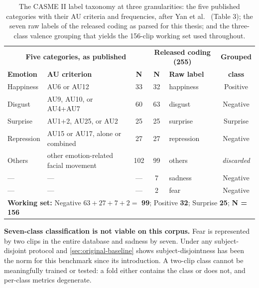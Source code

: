 \begin{table}[htbp]
	\centering
	\footnotesize
	\begin{tabular}{l l c c l c}
		\hline
		\multicolumn{3}{c}{\textbf{Five categories, as published}} & \multicolumn{2}{c}{\textbf{Released coding (255)}} & \textbf{Grouped} \\
		\textbf{Emotion} & \textbf{AU criterion} & \textbf{N} & \textbf{N} & \textbf{Raw label} & \textbf{class} \\
		\hline
		Happiness  & AU6 or AU12                           & 33  & 32 & happiness  & Positive \\
		Disgust    & AU9, AU10, or AU4+AU7                 & 60  & 63 & disgust    & Negative \\
		Surprise   & AU1+2, AU25, or AU2                   & 25  & 25 & surprise   & Surprise \\
		Repression & AU15 or AU17, alone or combined       & 27  & 27 & repression & Negative \\
		Others     & other emotion-related facial movement & 102 & 99 & others     & \textit{discarded} \\
		---        & ---                                   & --- & 7  & sadness    & Negative \\
		---        & ---                                   & --- & 2  & fear       & Negative \\
		\hline
		\multicolumn{6}{l}{\textbf{Working set:} Negative $63+27+7+2 = $ \textbf{99}; Positive \textbf{32}; Surprise \textbf{25}; \textbf{N = 156}} \\
		\hline
	\end{tabular}
	\caption[CASME II label taxonomy and the three-class working set]{The CASME II label taxonomy at three granularities: the five published categories with their AU criteria and frequencies, after Yan et al.~\cite{yan2014} (Table 3); the seven raw labels of the released coding as parsed for this thesis; and the three-class valence grouping that yields the 156-clip working set used throughout.}
	\label{tab:casme2-labels}
\end{table}

\textbf{Seven-class classification is not viable on this corpus.} Fear is represented by two clips in the entire database and sadness by seven. Under any subject-disjoint protocol and \autoref{sec:original-baseline} shows subject-disjointness has been the norm for this benchmark since its introduction. A two-clip class cannot be meaningfully trained or tested: a fold either contains the class or does not, and per-class metrics degenerate.

